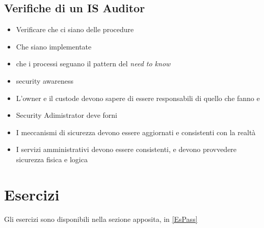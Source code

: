 \subsection{Verifiche di un IS Auditor}
\begin{itemize}
 \item Verificare che ci siano delle procedure
 \item Che siano implementate
 \item che i processi seguano il pattern del \textit{need to know}
 \item security awareness
 \item L'owner e il custode devono sapere di essere responsabili di quello che
 fanno e
 \item Security Adimistrator deve forni
 \item I meccanismi di sicurezza devono essere aggiornati e consistenti con la
 realtà
 \item I servizi amministrativi devono essere consistenti, e devono provvedere
 sicurezza fisica e logica
\end{itemize}

\section{Esercizi}

Gli esercizi sono disponibili nella sezione apposita, in \ref{EsPass}
